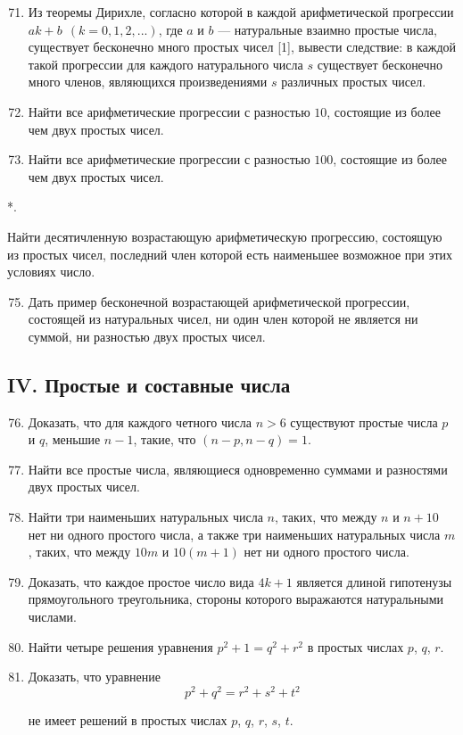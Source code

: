 \documentclass[12pt, a4paper, openany]{book}
\newcounter{namedlistcounter}  %
\newenvironment{withdot}
{\begin{list}
		{\arabic{namedlistcounter}*.} %
		{\usecounter{namedlistcounter}   %
			\setlength{\leftmargin}{3em}} %
	}
	{\end{list}}
\begin{document}
\begin{enumerate}
	\setcounter{enumi}{70}
	\item Из теоремы Дирихле, согласно которой в каждой арифметической прогрессии $ak+b \ \ (k=0,1,2,...)$, где $a$ и $b$ — натуральные взаимно простые числа, существует бесконечно много простых чисел [1], вывести следствие: в каждой такой прогрессии для каждого натурального числа $s$ существует бесконечно много членов, являющихся произведениями $s$ различных простых чисел.
	\item Найти все арифметические прогрессии с разностью $10$, состоящие из более чем двух простых чисел.
	\item Найти все арифметические прогрессии с разностью $100$, состоящие из более чем двух простых чисел.
\end{enumerate}

\begin{withdot}
	\addtocounter{namedlistcounter}{73}
	\item Найти десятичленную возрастающую арифметическую прогрессию, состоящую из простых чисел, последний член которой есть наименьшее возможное при этих условиях число.
\end{withdot}

\begin{enumerate}
	\setcounter{enumi}{74}
	\item Дать пример бесконечной возрастающей арифметической прогрессии, состоящей из натуральных чисел, ни один член которой не является ни суммой, ни разностью двух простых чисел.
\end{enumerate}

\subsection[IV. Простые и составные числа]{\center IV. Простые и составные числа}

\begin{enumerate}
	\setcounter{enumi}{75}
	\item Доказать, что для каждого четного числа $n>6$ существуют простые числа $p$ и $q$, меньшие $n-1$, такие, что $(n-p, n-q)=1$.
	\item Найти все простые числа, являющиеся одновременно суммами и разностями двух простых чисел.
	\item Найти три наименьших натуральных числа $n$, таких, что между $n$ и $n+10$ нет ни одного простого числа, а также три наименьших натуральных числа $m$, таких, что между $10m$ и $10(m+1)$ нет ни одного простого числа.
	\item Доказать, что каждое простое число вида $4k+1$ является длиной гипотенузы прямоугольного треугольника, стороны которого выражаются натуральными числами.
	\item Найти четыре решения уравнения $p^2+1 = q^2 + r^2$ в простых числах $p$, $q$, $r$.
	\item Доказать, что уравнение
	$$
	p^2 + q^2 = r^2 + s^2 + t^2
	$$
	
	не имеет решений в простых числах $p$, $q$, $r$, $s$, $t$.
\end{enumerate}
\end{document}
